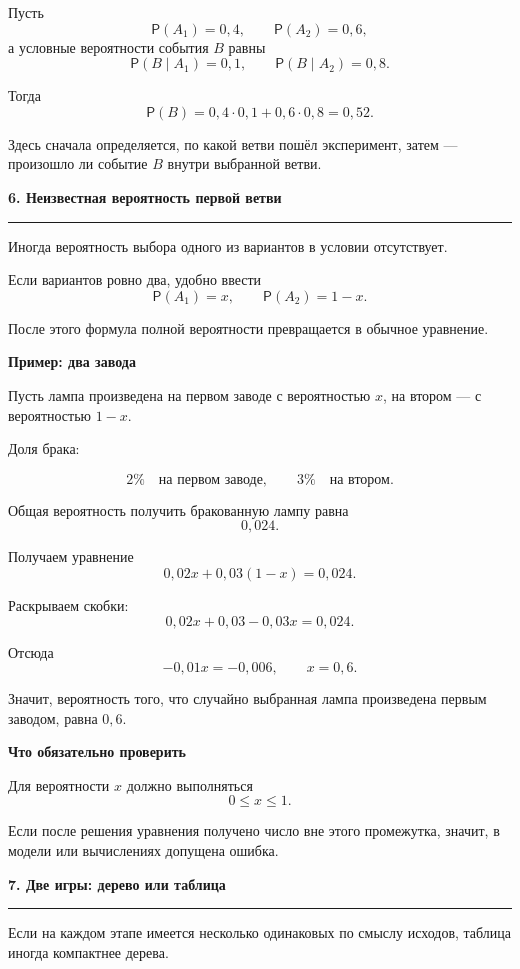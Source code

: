 \documentclass[a4paper,12pt]{article}
\newcommand{\Prob}{\mathsf{P}}
\newcommand{\topichead}[1]{%
  \vspace{0.5em}
  {\Large\bfseries\color{darkaccent}#1\par}
  \vspace{0.35em}
  {\color{accent}\rule{\linewidth}{0.7pt}}
  \vspace{0.5em}
}
\newcommand{\subtopic}[1]{%
  \vspace{0.4em}
  {\large\bfseries\color{darkaccent}#1\par}
  \vspace{0.15em}
}
\begin{document}
Пусть
\[
\Prob(A_1)=0{,}4,
\qquad
\Prob(A_2)=0{,}6,
\]
а условные вероятности события $B$ равны
\[
\Prob(B\mid A_1)=0{,}1,
\qquad
\Prob(B\mid A_2)=0{,}8.
\]

Тогда
\[
\Prob(B)
=
0{,}4\cdot0{,}1
+
0{,}6\cdot0{,}8
=
0{,}52.
\]

Здесь сначала определяется, по какой ветви пошёл эксперимент, затем ---
произошло ли событие $B$ внутри выбранной ветви.


\topichead{6. Неизвестная вероятность первой ветви}

Иногда вероятность выбора одного из вариантов в условии отсутствует.

Если вариантов ровно два, удобно ввести
\[
\Prob(A_1)=x,
\qquad
\Prob(A_2)=1-x.
\]

После этого формула полной вероятности превращается в обычное уравнение.

\subtopic{Пример: два завода}

Пусть лампа произведена на первом заводе с вероятностью $x$, на втором ---
с вероятностью $1-x$.

Доля брака:

\[
2\% \quad\text{на первом заводе},
\qquad
3\% \quad\text{на втором}.
\]

Общая вероятность получить бракованную лампу равна
\[
0{,}024.
\]

Получаем уравнение
\[
0{,}02x+0{,}03(1-x)=0{,}024.
\]

Раскрываем скобки:
\[
0{,}02x+0{,}03-0{,}03x=0{,}024.
\]

Отсюда
\[
-0{,}01x=-0{,}006,
\qquad
\boxed{x=0{,}6}.
\]

Значит, вероятность того, что случайно выбранная лампа произведена первым
заводом, равна $0{,}6$.

\subtopic{Что обязательно проверить}

Для вероятности $x$ должно выполняться
\[
0\le x\le1.
\]

Если после решения уравнения получено число вне этого промежутка, значит,
в модели или вычислениях допущена ошибка.


\topichead{7. Две игры: дерево или таблица}

Если на каждом этапе имеется несколько одинаковых по смыслу исходов,
таблица иногда компактнее дерева.
\end{document}
